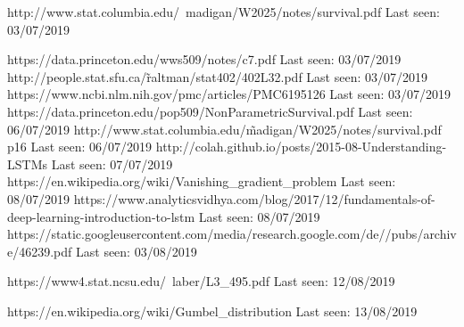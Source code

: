 \renewcommand\bibname{Netography}
\makeatletter
\renewcommand\@bibitem[1]{\item\if@filesw \immediate\write\@auxout
    {\string\bibcite{#1}{N\the\value{\@listctr}}}\fi\ignorespaces}%
\def\@biblabel#1{[N#1]}%
\makeatother

\begin{thebibliography}{9}
http://www.stat.columbia.edu/~madigan/W2025/notes/survival.pdf \newline Last seen: 03/07/2019

https://data.princeton.edu/wws509/notes/c7.pdf \newline  Last seen: 03/07/2019
http://people.stat.sfu.ca/\~raltman/stat402/402L32.pdf \newline Last seen: 03/07/2019
https://www.ncbi.nlm.nih.gov/pmc/articles/PMC6195126 \newline Last seen: 03/07/2019
https://data.princeton.edu/pop509/NonParametricSurvival.pdf \newline Last seen: 06/07/2019
http://www.stat.columbia.edu/\~madigan/W2025/notes/survival.pdf p16  \newline Last seen: 06/07/2019
http://colah.github.io/posts/2015-08-Understanding-LSTMs \newline Last seen: 07/07/2019
https://en.wikipedia.org/wiki/Vanishing\_gradient\_problem \newline Last seen: 08/07/2019
https://www.analyticsvidhya.com/blog/2017/12/fundamentals-of-deep-learning-introduction-to-lstm \newline Last seen: 08/07/2019
https://static.googleusercontent.com/media/research.google.com/de//pubs/archive/46239.pdf \newline Last seen: 03/08/2019

https://www4.stat.ncsu.edu/~laber/L3\_495.pdf
\newline Last seen: 12/08/2019


https://en.wikipedia.org/wiki/Gumbel\_distribution
\newline Last seen: 13/08/2019

\end{thebibliography}
